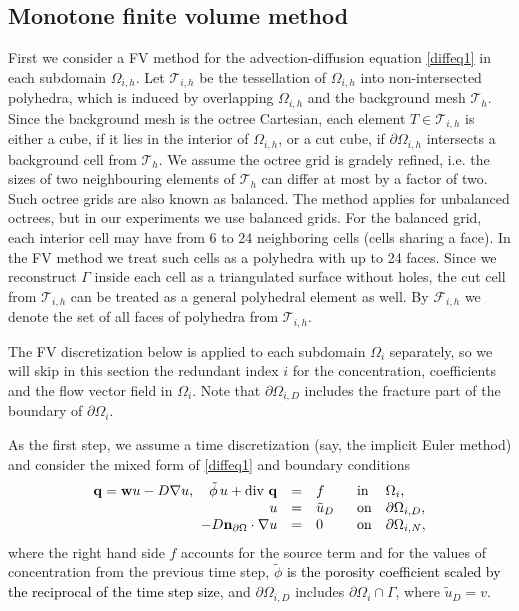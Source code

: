 \documentclass{article}
\newcommand{\rev}[1]{\textcolor{black}{{#1}}}
\newcommand{\bI}{\mathbf I}
\newcommand{\bn}{\mathbf n}
\newcommand{\bw}{\mathbf w}
\newcommand{\bq}{\mathbf q}
\newcommand{\F}{\mathcal F}
\newcommand{\T}{\mathcal T}
\def\dO{{\partial\Omega} }
\begin{document}
\subsection{Monotone finite volume method} \label{s_FV}
First we consider a FV method for the advection-diffusion equation \eqref{diffeq1} in each subdomain $\Omega_{i,h}$.
Let $\T_{i,h}$ be the tessellation  of $\Omega_{i,h}$ into non-intersected polyhedra, which is induced by overlapping $\Omega_{i,h}$ and the background mesh $\T_h$.   Since the background mesh is the octree Cartesian, each element $T\in\T_{i,h}$ is either a cube, if it lies in the interior of $\Omega_{i,h}$, or a cut cube, if $\dO_{i,h}$ intersects a background cell from $\T_h$. We assume the octree grid is gradely refined, i.e. the sizes of two neighbouring elements of $\T_h$ can differ at most by a factor of two.  Such octree grids are also known as balanced. The method applies for unbalanced octrees, but in our experiments we use balanced grids.
For the balanced grid,  each interior cell may have from 6 to 24 neighboring cells (cells sharing a face). In the FV method we treat such cells as a polyhedra with up to 24 faces.   Since we reconstruct $\Gamma$ inside each cell as a triangulated surface without holes, the cut cell from $\T_{i,h}$ can be treated as a general polyhedral element as well. By $\F_{i,h}$ we denote the set of all faces of polyhedra from $\T_{i,h}$.

The FV discretization below is applied to each subdomain $\Omega_i$ separately, so we will skip in this section the  redundant index $i$ for the concentration, coefficients and the flow vector field in $\Omega_i$. Note that $\dO_{i,D}$
includes the fracture part of the boundary of $\dO_i$.

As the first step,  we assume a time discretization (say, the implicit Euler method) and consider the mixed form of  \eqref{diffeq1}  and  boundary conditions
\begin{equation}\label{lap}
\begin{array}{rclll}
  \bq = \bw u - D \nabla u, \quad
  \tilde\phi\,u+\mbox{\rm div } \bq  &=& f \quad     & \mbox{~in} & \Omega_i,  \\
       u &=& \tilde{u}_D                     & \mbox{~on} & \dO_{i,D} ,  \\
       -D \bn_\dO \cdot \nabla u &=&0 & \text{~on}& \dO_{i,N},
\end{array}
\end{equation}
where the right hand side $f$ accounts for the source term and for the values of concentration from the previous time step, $\tilde \phi$ \rev{is the porosity coefficient scaled by the reciprocal of the time step size}, and $\dO_{i,D}$ includes $\dO_i\cap\Gamma$, where $\tilde{u}_D=v$.
\end{document}
